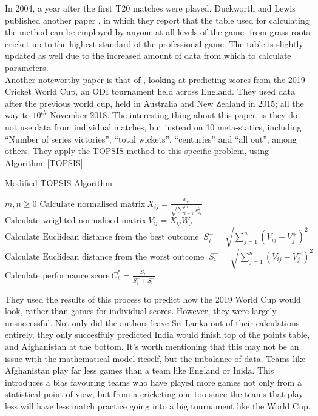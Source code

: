 In 2004, a year after the first T20 matches were played, Duckworth and Lewis published another paper \cite{duckworth2}, in which they report
that the table used for calculating the method can be employed by anyone at all levels of the game- from grass-roots cricket up to the highest standard of 
the professional game. The table is slightly updated as well due to the increased amount of data from which to calculate parameters. \\

Another noteworthy paper is that of \cite{saqlain}, looking at predicting scores from the 2019 Cricket World Cup, an ODI
tournament held across England. They used data after the previous world cup, held in Australia and New Zealand in 2015; all the way to $10^{th}$ November
2018. The interesting thing about this paper, is they do not use data from individual matches, but instead on 10 meta-statics, including 
``Number of series victories'', ``total wickets'', ``centuries'' and ``all out'', among others. They apply the TOPSIS method to this specific problem, using Algorithm~\ref{TOPSIS}. \\

\begin{algorithm}[h]
\caption{Modified TOPSIS Algorithm}\label{TOPSIS}
\begin{algorithmic}[1]
    \Require $m,n \geq 0$
    \State $\text{Calculate normalised matrix} \ X_{ij} = \frac{x_{ij}}{\sqrt{\sum_{i=1}^mx_{ij}^2}}$
    \State $\text{Calculate weighted normalised matrix} \ V_{ij}=X_{ij}W_j$
        \State $\text{Calculate Euclidean distance from the best outcome } \ S_i^+ = \sqrt{\sum_{j=1}^n(V_{ij}-V_j^+)^2} \ $
        \State $\text{Calculate Euclidean distance from the worst outcome } \ S_i^- = \sqrt{\sum_{j=1}^n(V_{ij}-V_j^-)^2} \ $
    \EndFor
    \State $\text{Calculate performance score} \ C_i^* = \frac{S_i^-}{S_i^+  + S_i^-}$
\end{algorithmic}
\end{algorithm}

They used the results of this process to predict how the 2019 World Cup would look, rather than games for individual scores. However, they were largely unsuccessful. 
Not only did the authors leave Sri Lanka out of their calculations entirely, they only succesffuly predicted India would finish top of the points table, and Afghanistan 
at the bottom. It's worth mentioning that this may not be an issue with the mathematical model iteself, but the imbalance of data. Teams like Afghanistan play far less games 
than a team like England or Inida. This introduces a bias favouring teams who have played more games not only from a statistical point of view, but from a cricketing one too 
since the teams that play less will have less match practice going into a big tournament like the World Cup. \\

